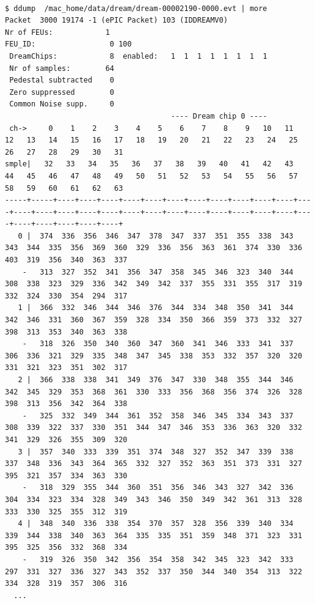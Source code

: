 \documentclass{article}[11pt]
\begin{document}
\begin{Verbatim}[fontsize=\tiny]

$ ddump  /mac_home/data/dream/dream-00002190-0000.evt | more
Packet  3000 19174 -1 (ePIC Packet) 103 (IDDREAMV0)
Nr of FEUs:            1
FEU_ID:                 0 100
 DreamChips:            8  enabled:   1  1  1  1  1  1  1  1
 Nr of samples:        64
 Pedestal subtracted    0
 Zero suppressed        0
 Common Noise supp.     0
                                      ---- Dream chip 0 ----
 ch->     0    1    2    3    4    5    6    7    8    9   10   11   12   13   14   15   16   17   18   19   20   21   22   23   24   25   26   27   28   29   30   31
smple|   32   33   34   35   36   37   38   39   40   41   42   43   44   45   46   47   48   49   50   51   52   53   54   55   56   57   58   59   60   61   62   63
-----+-----+----+----+----+----+----+----+----+----+----+----+----+----+----+----+----+----+----+----+----+----+----+----+----+----+----+----+----+----+----+----+----+
   0 |  374  336  356  346  347  378  347  337  351  355  338  343  343  344  335  356  369  360  329  336  356  363  361  374  330  336  403  319  356  340  363  337
    -   313  327  352  341  356  347  358  345  346  323  340  344  308  338  323  329  336  342  349  342  337  355  331  355  317  319  332  324  330  354  294  317
   1 |  366  332  346  344  346  376  344  334  348  350  341  344  342  346  331  360  367  359  328  334  350  366  359  373  332  327  398  313  353  340  363  338
    -   318  326  350  340  360  347  360  341  346  333  341  337  306  336  321  329  335  348  347  345  338  353  332  357  320  320  331  321  323  351  302  317
   2 |  366  338  338  341  349  376  347  330  348  355  344  346  342  345  329  353  368  361  330  333  356  368  356  374  326  328  398  313  356  342  364  338
    -   325  332  349  344  361  352  358  346  345  334  343  337  308  339  322  337  330  351  344  347  346  353  336  363  320  332  341  329  326  355  309  320
   3 |  357  340  333  339  351  374  348  327  352  347  339  338  337  348  336  343  364  365  332  327  352  363  351  373  331  327  395  321  357  334  363  330
    -   318  329  355  344  360  351  356  346  343  327  342  336  304  334  323  334  328  349  343  346  350  349  342  361  313  328  333  330  325  355  312  319
   4 |  348  340  336  338  354  370  357  328  356  339  340  334  339  344  338  340  363  364  335  335  351  359  348  371  323  331  395  325  356  332  368  334
    -   319  326  350  342  356  354  358  342  345  323  342  333  297  331  327  336  327  343  352  337  350  344  340  354  313  322  334  328  319  357  306  316
  ...
\end{Verbatim}
\end{document}
